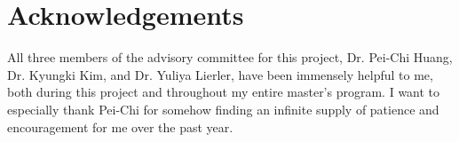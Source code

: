 \section*{Acknowledgements}
All three members of the advisory committee for this project, Dr. Pei-Chi Huang, Dr. Kyungki Kim, and Dr. Yuliya Lierler, have been immensely helpful to me, both during this project and throughout my entire master's program. I want to especially thank Pei-Chi for somehow finding an infinite supply of patience and encouragement for me over the past year.